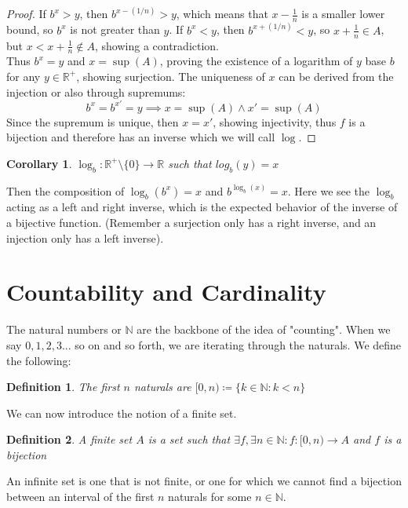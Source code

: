 \documentclass{article}
\newtheorem{defn}{Definition}[section]
\newtheorem{cor}{Corollary}[section]
\begin{document}
\begin{proof}
If $b^x > y$, then $b^{x - (1/n)} > y$, which means that $x - \frac{1}{n}$ is a smaller lower bound, so $b^x$ is not greater than $y$. If $b^x < y$, then $b^{x + (1/n)} < y$, so $x + \frac{1}{n} \in A$, but $x < x + \frac{1}{n} \notin A$, showing a contradiction.\\

Thus $b^x = y$ and $x = \sup(A)$, proving the existence of a logarithm of $y$ base $b$ for any $y \in \mathbb{R}^+$, showing surjection. The uniqueness of $x$ can be derived from the injection or also through supremums:
\begin{equation*}
    b^x = b^{x'} = y \implies x = \sup(A) \land x' = \sup(A)
\end{equation*}
Since the supremum is unique, then $x = x'$, showing injectivity, thus $f$ is a bijection and therefore has an inverse which we will call $\log$.
\end{proof}
\begin{cor}
$\log_b: \mathbb{R}^+ \setminus \{0\} \xrightarrow{} \mathbb{R}$ such that $log_b(y) = x$
\end{cor}
Then the composition of $\log_b(b^x) = x$ and $b^{\log_b(x)} = x$. Here we see the $\log_b$ acting as a left and right inverse, which is the expected behavior of the inverse of a bijective function. (Remember a surjection only has a right inverse, and an injection only has a left inverse).
\pagebreak

\section{Countability and Cardinality}
The natural numbers or $\mathbb{N}$ are the backbone of the idea of "counting". When we say $0, 1, 2, 3...$ so on and so forth, we are iterating through the naturals. We define the following:
\begin{defn}
    The first $n$ naturals are $[0, n) \coloneq \{k \in \mathbb{N}: k < n\}$
\end{defn}
We can now introduce the notion of a finite set.
\begin{defn}
    A finite set $A$ is a set such that $\exists f, \exists n \in \mathbb{N}: f: [0, n) \xrightarrow{} A$ and $f$ is a bijection
\end{defn}
An infinite set is one that is not finite, or one for which we cannot find a bijection between an interval of the first $n$ naturals for some $n \in \mathbb{N}$.\\
\end{document}
